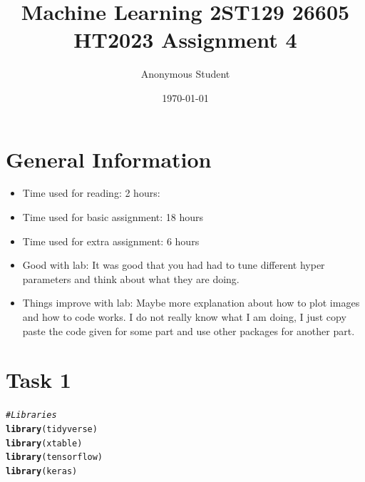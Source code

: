 \documentclass[10pt, a4paper, english]{article}\usepackage[]{graphicx}\usepackage[dvipsnames]{xcolor}
\title{Machine Learning 2ST129 26605 HT2023
 Assignment 4}
\author{Anonymous Student}
\date{\today}
\makeatletter
\newcommand{\hlcom}[1]{\textcolor[rgb]{0.678,0.584,0.686}{\textit{#1}}}%
\newcommand{\hlstd}[1]{\textcolor[rgb]{0.345,0.345,0.345}{#1}}%
\newcommand{\hlkwd}[1]{\textcolor[rgb]{0.737,0.353,0.396}{\textbf{#1}}}%
\newenvironment{kframe}{%
 \def\at@end@of@kframe{}%
 \ifinner\ifhmode%
  \def\at@end@of@kframe{\end{minipage}}%
  \begin{minipage}{\columnwidth}%
 \fi\fi%
 \def\FrameCommand##1{\hskip\@totalleftmargin \hskip-\fboxsep
 \colorbox{shadecolor}{##1}\hskip-\fboxsep
     \hskip-\linewidth \hskip-\@totalleftmargin \hskip\columnwidth}%
 \MakeFramed {\advance\hsize-\width
   \@totalleftmargin\z@ \linewidth\hsize
   \@setminipage}}%
 {\par\unskip\endMakeFramed%
 \at@end@of@kframe}
\newenvironment{knitrout}{}{} %
\makeatother
\begin{document}
\maketitle
\newpage
\tableofcontents
\newpage

\section*{General Information}
\begin{itemize}
\item Time used for reading: 2 hours: 
\item Time used for basic assignment: 18 hours 
\item Time used for extra assignment: 6 hours 
\item Good with lab: It was good that you had had to tune different hyper parameters and think about what they are doing.
\item Things improve with lab: Maybe more explanation about how to plot images and how to code works. I do not really know what I am doing, I just copy paste the code given for some part and use other packages for another part. 
\end{itemize}





\section{Task 1}
\begin{knitrout}
\color{fgcolor}\begin{kframe}
\begin{alltt}
\hlcom{#Libraries}
 \hlkwd{library}\hlstd{(tidyverse)}
 \hlkwd{library}\hlstd{(xtable)}
 \hlkwd{library}\hlstd{(tensorflow)}
 \hlkwd{library}\hlstd{(keras)}
\end{alltt}
\end{kframe}
\end{knitrout}
\end{document}
